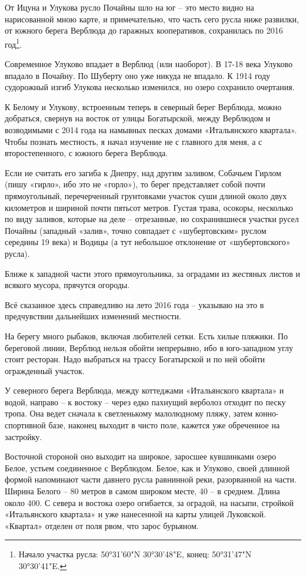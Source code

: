 От Ицуна и Улукова русло Почайны шло на юг – это место видно на нарисованной мною карте, и примечательно, что часть сего русла ниже развилки, от южного берега Верблюда до гаражных кооперативов, сохранилась по 2016 год\footnote{Начало участка русла: 50°31'60"N  30°30'48"E, конец: 50°31'47"N 30°30'41"E.}. 

Современное Улуково впадает в Верблюд (или наоборот). В 17-18 века Улуково впадало в Почайну. По Шуберту оно уже никуда не впадало. К 1914 году судорожный изгиб Улукова несколько изменился, но озеро сохранило очертания.

К Белому и Улукову, встроенным теперь в северный берег Верблюда, можно добраться, свернув на восток от улицы Богатырской, между Верблюдом и возводимыми с 2014 года на намывных песках домами «Итальянского квартала». Чтобы познать местность, я начал изучение не с главного для меня, а с второстепенного, с южного берега Верблюда.

Если не считать его загиба к Днепру, над другим заливом, Собачьем Гирлом (пишу «гирло», ибо это не «горло»), то берег представляет собой почти прямоугольный, перечерченный грунтовками участок суши длиной около двух километров и шириной почти пятьсот метров. Густая трава, осокоры, несколько по виду заливов, которые на деле – отрезанные, но сохранившиеся участки русел Почайны (западный «залив», точно совпадает с «шубертовским» руслом середины 19 века) и Водицы (а тут небольшое отклонение от «шубертовского» русла).

Ближе к западной части этого прямоугольника, за оградами из жестяных листов и всякого мусора, прячутся огороды.

Всё сказанное здесь справедливо на лето 2016 года – указываю на это в предчувствии дальнейших изменений местности.

На берегу много рыбаков, включая любителей сетки. Есть хилые пляжики. По береговой линии, Верблюд нельзя обойти непрерывно, ибо в юго-западном углу стоит ресторан. Надо выбраться на трассу Богатырской и по ней обойти огражденный участок.

У северного берега Верблюда, между коттеджами «Итальянского квартала» и водой, направо – к востоку – через едко пахнущий верболоз отходит по песку тропа. Она ведет сначала к светленькому малолюдному пляжу, затем конно-спортивной базе, наконец выходит в чисто поле, кажется уже обреченное на застройку.

Восточной стороной оно выходит на широкое, заросшее кувшинками озеро Белое, устьем соединенное с Верблюдом. Белое, как и Улуково, своей длинной формой напоминают части давнего русла равнинной реки, разорванной на части. Ширина Белого – 80 метров в самом широком месте, 40 – в среднем. Длина около 400. С севера и востока озеро огибается, за оградой, на насыпи, стройкой «Итальянского квартала» и уже нанесенной на карты улицей Луковской. «Квартал» отделен от поля рвом, что зарос бурьяном.

